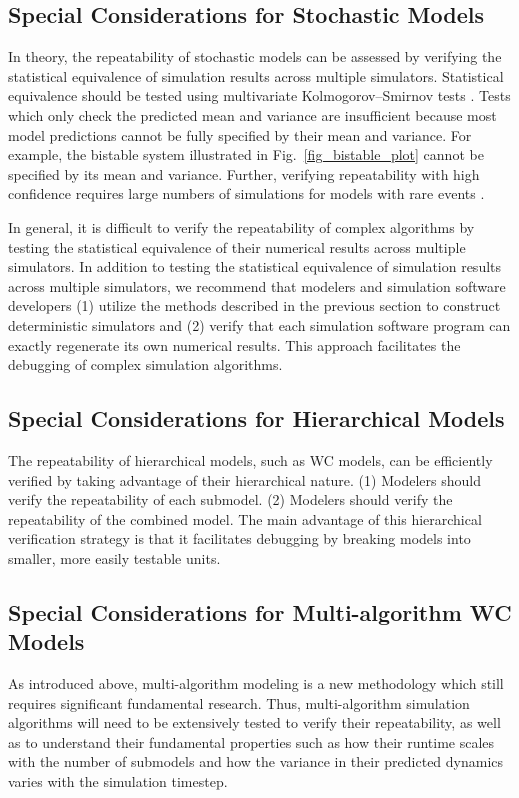 \documentclass[journal,transmag,twoside]{IEEEtran}
\begin{document}
\subsection{Special Considerations for Stochastic Models}
In theory, the repeatability of stochastic models can be assessed by verifying the statistical equivalence of simulation results across multiple simulators. Statistical equivalence should be tested using multivariate Kolmogorov–Smirnov tests \cite{justel1997multivariate}. Tests which only check the predicted mean and variance are insufficient because most model predictions cannot be fully specified by their mean and variance. For example, the bistable system illustrated in Fig.~\ref{fig_bistable_plot} cannot be specified by its mean and variance. Further, verifying repeatability with high confidence requires large numbers of simulations for models with rare events \cite{kim2013nonlinear}. 

In general, it is difficult to verify the repeatability of complex algorithms by testing the statistical equivalence of their numerical results across multiple simulators. In addition to testing the statistical equivalence of simulation results across multiple simulators, we recommend that modelers and simulation software developers (1) utilize the methods described in the previous section to construct deterministic simulators and (2) verify that each simulation software program can exactly regenerate its own numerical results. This approach facilitates the debugging of complex simulation algorithms.

\subsection{Special Considerations for Hierarchical Models}
The repeatability of hierarchical models, such as WC models, can be efficiently verified by taking advantage of their hierarchical nature. (1) Modelers should verify the repeatability of each submodel. (2) Modelers should verify the repeatability of the combined model. The main advantage of this hierarchical verification strategy is that it facilitates debugging by breaking models into smaller, more easily testable units. 

\subsection{Special Considerations for Multi-algorithm WC Models}
As introduced above, multi-algorithm modeling is a new methodology which still requires significant fundamental research. Thus, multi-algorithm simulation algorithms will need to be extensively tested to verify their repeatability, as well as to understand their fundamental properties such as how their runtime scales with the number of submodels and how the variance in their predicted dynamics varies with the simulation timestep.
\end{document}
